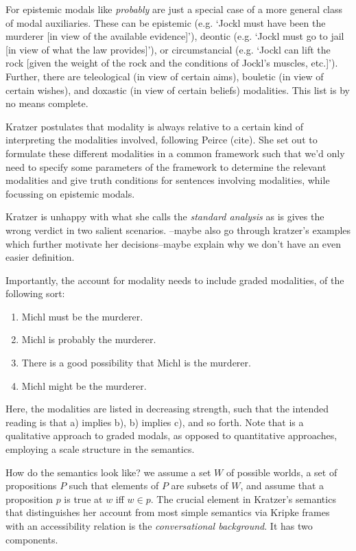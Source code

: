 \documentclass{article}
\theoremstyle{definition}
\begin{document}
For \textcite{kratzer91_modal} epistemic modals like \emph{probably} are just a special case of a more general class of modal auxiliaries.
These can be epistemic (e.g. `Jockl must have been the murderer [in view of the available evidence]'), deontic (e.g. `Jockl must go to jail [in view of what the law provides]'), or circumstancial (e.g. `Jockl can lift the rock [given the weight of the rock and the conditions of Jockl's muscles, etc.]').
Further, there are teleological (in view of certain aims), bouletic (in view of certain wishes), and doxastic (in view of certain beliefs) modalities.
This list is by no means complete.

Kratzer postulates that modality is always relative to a certain kind of interpreting the modalities involved, following Peirce (cite).
She set out to formulate these different modalities in a common framework such that we'd only need to specify some parameters of the framework to determine the relevant modalities and give truth conditions for sentences involving modalities, while focussing on epistemic modals.

Kratzer is unhappy with what she calls the \emph{standard analysis} as is gives the wrong verdict in two salient scenarios.
--maybe also go through kratzer's examples which further motivate her decisions--maybe explain why we don't have an even easier definition.

Importantly, the account for modality needs to include graded modalities, of the following sort:
\begin{enumerate}[nosep,label=\alph*)]
  \item Michl must be the murderer.
  \item Michl is probably the murderer.
  \item There is a good possibility that Michl is the murderer.
  \item Michl might be the murderer.
\end{enumerate}
Here, the modalities are listed in decreasing strength, such that the intended
reading is that a) implies b), b) implies c), and so forth.
Note that is a qualitative approach to graded modals, as opposed to quantitative approaches, employing a scale structure in the semantics.

How do the semantics look like?
we assume a set $W$ of possible worlds, a set of propositions $P$ such that elements of $P$ are subsets of $W$, and assume that a proposition $p$ is true at $w$ iff $w \in p$.
The crucial element in Kratzer's semantics that distinguishes her account from most simple semantics via Kripke frames with an accessibility relation is the \emph{conversational background}.
It has two components.
\end{document}

